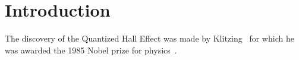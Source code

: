 


\section{Introduction}
The discovery of the Quantized Hall Effect was made by
Klitzing~\cite{klitzing:qhe} for which he was awarded the 1985 Nobel
prize for physics~\cite{klitzing:nobel}.




